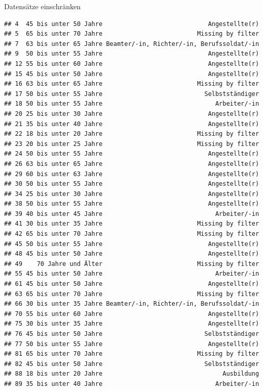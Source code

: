 \documentclass[ignorenonframetext,]{beamer}
\begin{document}
\begin{frame}[fragile]{Datensätze einschränken}
\begin{verbatim}
## 4  45 bis unter 50 Jahre                             Angestellte(r)
## 5  65 bis unter 70 Jahre                          Missing by filter
## 7  63 bis unter 65 Jahre Beamter/-in, Richter/-in, Berufssoldat/-in
## 9  50 bis unter 55 Jahre                             Angestellte(r)
## 12 55 bis unter 60 Jahre                             Angestellte(r)
## 15 45 bis unter 50 Jahre                             Angestellte(r)
## 16 63 bis unter 65 Jahre                          Missing by filter
## 17 50 bis unter 55 Jahre                            Selbstständiger
## 18 50 bis unter 55 Jahre                               Arbeiter/-in
## 20 25 bis unter 30 Jahre                             Angestellte(r)
## 21 35 bis unter 40 Jahre                             Angestellte(r)
## 22 18 bis unter 20 Jahre                          Missing by filter
## 23 20 bis unter 25 Jahre                          Missing by filter
## 24 50 bis unter 55 Jahre                             Angestellte(r)
## 26 63 bis unter 65 Jahre                             Angestellte(r)
## 29 60 bis unter 63 Jahre                             Angestellte(r)
## 30 50 bis unter 55 Jahre                             Angestellte(r)
## 34 25 bis unter 30 Jahre                             Angestellte(r)
## 38 50 bis unter 55 Jahre                             Angestellte(r)
## 39 40 bis unter 45 Jahre                               Arbeiter/-in
## 41 30 bis unter 35 Jahre                          Missing by filter
## 42 65 bis unter 70 Jahre                          Missing by filter
## 45 50 bis unter 55 Jahre                             Angestellte(r)
## 48 45 bis unter 50 Jahre                             Angestellte(r)
## 49    70 Jahre und Älter                          Missing by filter
## 55 45 bis unter 50 Jahre                               Arbeiter/-in
## 61 45 bis unter 50 Jahre                             Angestellte(r)
## 63 65 bis unter 70 Jahre                          Missing by filter
## 66 30 bis unter 35 Jahre Beamter/-in, Richter/-in, Berufssoldat/-in
## 70 55 bis unter 60 Jahre                             Angestellte(r)
## 75 30 bis unter 35 Jahre                             Angestellte(r)
## 76 45 bis unter 50 Jahre                            Selbstständiger
## 77 50 bis unter 55 Jahre                             Angestellte(r)
## 81 65 bis unter 70 Jahre                          Missing by filter
## 82 45 bis unter 50 Jahre                            Selbstständiger
## 88 18 bis unter 20 Jahre                                 Ausbildung
## 89 35 bis unter 40 Jahre                               Arbeiter/-in

\end{verbatim}
\end{frame}
\end{document}
